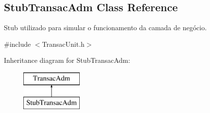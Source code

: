\hypertarget{classStubTransacAdm}{\subsection{Stub\-Transac\-Adm Class Reference}
\label{d9/d0f/classStubTransacAdm}
}


Stub utilizado para simular o funcionamento da camada de negócio.  




{\ttfamily \#include $<$Transac\-Unit.\-h$>$}

Inheritance diagram for Stub\-Transac\-Adm\-:\begin{figure}[H]
\begin{center}
\leavevmode
\includegraphics[height=2.000000cm]{d9/d0f/classStubTransacAdm}
\end{center}
\end{figure}
